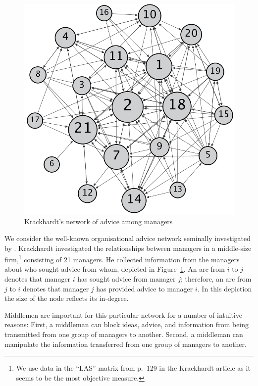 \begin{figure}[h]
\centering
\includegraphics[scale=0.45]{Images/krack.png}
\caption{Krackhardt's network of advice among managers}
\label{krackhardtnetwork}
\end{figure}

We consider the well-known organisational advice network seminally investigated by \citet{Krackhardt1987}. Krackhardt investigated the relationships between managers in a middle-size firm,\footnote{We use data in the ``LAS'' matrix from p.~129 in the Krackhardt article as it seems to be the most objective measure.} consisting of 21 managers. He collected information from the managers about who sought advice from whom, depicted in Figure~\ref{krackhardtnetwork}. An arc from $i$ to $j$ denotes that manager $i$ has sought advice from manager $j$; therefore, an arc from $j$ to $i$ denotes that manager $j$ has provided advice to manager $i$. In this depiction the size of the node reflects its in-degree.

Middlemen are important for this particular network for a number of intuitive reasons: First, a middleman can block ideas, advice, and information from being transmitted from one group of managers to another. Second, a middleman can manipulate the information transferred from one group of managers to another.

